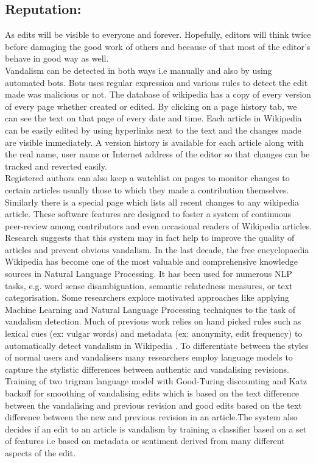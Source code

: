 \documentclass[12pt]{article}
\begin{document}
\subsection*{Reputation:}As edits will be visible to everyone and forever. Hopefully, editors will think twice before damaging the good work of others and because of that most of the editor's behave in good way as well.\\
Vandalism can be detected in both ways i.e manually and also by using automated bots.\cite{help} Bots uses regular expression and various rules to detect  the edit made was malicious or not. The database of wikipedia has a copy of every version of every page whether created or edited. By clicking on a page history tab, we can see the text on that page of every date and time. Each article in Wikipedia can be easily edited by using hyperlinks next to the text  and the changes made are visible immediately. A version history is available for each article along with the real name, user name or Internet address of the editor so that changes can be tracked and reverted easily. \\Registered authors can also keep a watchlist on pages to monitor changes to certain articles usually those to which they made a contribution themselves. Similarly there is a special page which lists all recent changes to any wikipedia article. These software features are designed to foster a system of continuous peer-review among contributors and even occasional readers of Wikipedia articles. Research suggests that this system may in fact help to improve the quality of articles and prevent obvious vandalism\cite{help}.
In the last decade, the free encyclopaedia Wikipedia has become one of the most valuable and comprehensive knowledge sources in Natural Language Processing\cite{anthology}. It has been used for numerous NLP tasks, e.g. word sense disambiguation, semantic relatedness measures, or text categorisation. Some researchers explore motivated approaches like applying Machine Learning and Natural Language Processing techniques to the task of vandalism detection\cite{Harpalani}. Much of previous work relies on hand picked rules such as lexical cues (ex: vulgar words) and metadata (ex: anonymity, edit frequency) to automatically detect vandalism in Wikipedia \cite{potthast}. To differentiate between the styles of normal users and vandalisers many researchers employ language models to capture the stylistic differences between authentic and vandalising revisions. Training of two trigram language model with Good-Turing discounting and Katz backoff for smoothing of vandalising edits  which is based on the text difference between the vandalising and previous revision and good edits based on the text difference between the new and previous revision in an article\cite{Harpalani}.The system also decides if an edit to an article is vandalism by training a classifier based on a set of features i.e based on metadata or sentiment derived from many different aspects of the edit.
\end{document}
